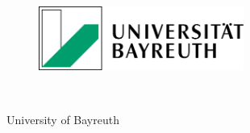 


%


\thispagestyle{empty}


\begin{figure}[t]
 \centering
 \includegraphics[width=0.6\textwidth]{abb/logo1}
~~~~~~~~~~
\end{figure}


\begin{verbatim}


\end{verbatim}

\begin{center}
\Large{University of Bayreuth}\\
\end{center}


